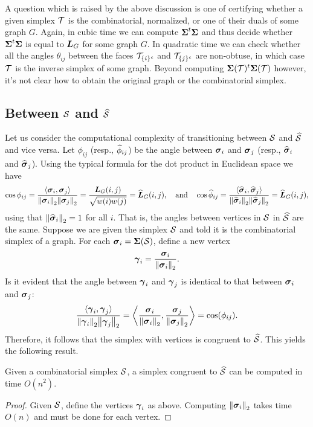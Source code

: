A question which is raised by the above discussion is one of certifying whether a given simplex $\mathcal{T}$ is the combinatorial, normalized, or one of their duals of some graph $G$. Again, in cubic time we can compute $\boldsymbol{\Sigma}^t\boldsymbol{\Sigma}$ and thus decide whether $\boldsymbol{\Sigma}^t\boldsymbol{\Sigma}$ is equal to $\vb*{L}_G$ for some graph $G$. In quadratic time we can check whether all the angles $\theta_{ij}$ between the faces $\mathcal{T}_{\{i\}^c}$ and $\mathcal{T}_{\{j\}^c}$ are non-obtuse, in which case $\mathcal{T}$ is the inverse simplex of some graph. Beyond computing $\boldsymbol{\Sigma}(\mathcal{T})^t \boldsymbol{\Sigma}(\mathcal{T})$ however, it's not clear how to obtain the original graph or the combinatorial simplex. 

\subsection{Between \texorpdfstring{$\mathcal{S}$}{the combinatorial} and \texorpdfstring{$\widehat{\mathcal{S}}$}{normalized simplex.}}
Let us consider the computational complexity of transitioning between $\mathcal{S}$ and $\widehat{\mathcal{S}}$ and vice versa. Let $\phi_{ij}$ (resp., $\widehat{\phi}_{ij}$) be the angle between $\vb*{\sigma}_i$ and $\vb*{\sigma}_j$ (resp., $\widehat{\vb*{\sigma}}_i$ and $\widehat{\vb*{\sigma}}_j$). Using the typical formula for the dot product in Euclidean space we have
\begin{equation*}
\cos\phi_{ij} = \frac{\langle \vb*{\sigma}_i,\vb*{\sigma}_j\rangle }{\norm{\vb*{\sigma}_i}_2\norm{\vb*{\sigma}_j}_2} = \frac{\vb*{L}_G(i,j)}{\sqrt{w(i)w(j)}} = \widehat{\vb*{L}}_G(i,j), \quad\text{and}\quad \cos\widehat{\phi}_{ij} = \frac{\langle \widehat{\vb*{\sigma}}_i,\widehat{\vb*{\sigma}}_j\rangle }{\norm{\widehat{\vb*{\sigma}}_i}_2\norm{\widehat{\vb*{\sigma}}_j}_2} = \widehat{\vb*{L}}_G(i,j),
\end{equation*}
using that $\norm{\widehat{\vb*{\sigma}}_i}_2=1$ for all $i$. 
That is, the angles between vertices in $\mathcal{S}$ in $\widehat{\mathcal{S}}$ are the same. Suppose we are given the simplex $\mathcal{S}$ and told it is the combinatorial simplex of a graph. For each $\vb*{\sigma}_i = \boldsymbol{\Sigma}(\mathcal{S})$, define a new vertex 
\[\vb*{\gamma}_i = \frac{\vb*{\sigma}_i}{\norm{\vb*{\sigma}_i}_2}.\]
Is it evident that the angle between $\vb*{\gamma}_i$ and $\vb*{\gamma}_j$ is identical to that between $\vb*{\sigma}_i$ and $\vb*{\sigma}_j$: 
\begin{equation*}
\frac{\langle \vb*{\gamma}_i,\vb*{\gamma}_j\rangle}{\norm{\vb*{\gamma}_i}_2\norm{\vb*{\gamma}_j}_2} = \bigg\langle \frac{\vb*{\sigma}_i}{\norm{\vb*{\sigma}_i}_2},\frac{\vb*{\sigma}_j}{\norm{\vb*{\sigma}_j}_2}\bigg\rangle = \cos(\phi_{ij}).
\end{equation*}
Therefore, it follows that the simplex with vertices is congruent  to $\widehat{\mathcal{S}}$. This yields the following result. 

\begin{lemma}
	Given a combinatorial simplex $\mathcal{S}$, a simplex congruent to $\widehat{\mathcal{S}}$ can be computed in time $O(n^2)$. 
\end{lemma}
\begin{proof}
	Given $\mathcal{S}$, define the vertices $\vb*{\gamma}_i$ as above. Computing $\norm{\vb*{\sigma}_i}_2$ takes time $O(n)$ and must be done for each vertex. 
\end{proof}


